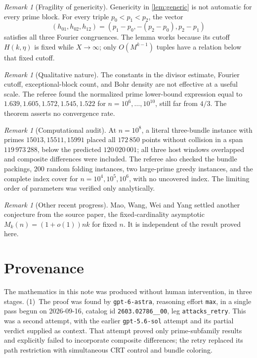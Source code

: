 \documentclass[11pt,a4paper]{article}
\theoremstyle{plain}
\theoremstyle{definition}
\theoremstyle{remark}
\newtheorem{remark}[theorem]{Remark}
\begin{document}
\begin{remark}[Fragility of genericity]
Genericity in \cref{lem:generic} is not automatic for every prime block. For every triple $p_0<p_1<p_2$, the vector
\[
 (h_{01},h_{02},h_{12})
 =(p_1-p_0,-(p_2-p_0),p_2-p_1)
\]
satisfies all three Fourier congruences. The lemma works because its cutoff $H(k,\eta)$ is fixed while $X\to\infty$; only $O(M^{k-1})$ tuples have a relation below that fixed cutoff.
\end{remark}

\begin{remark}[Qualitative nature]
The constants in the divisor estimate, Fourier cutoff, exceptional-block count, and Bohr density are not effective at a useful scale. The referee found the normalized prime lower-bound expression equal to $1.639,1.605,1.572,1.545,1.522$ for $n=10^6,\ldots,10^{10}$, still far from $4/3$. The theorem asserts no convergence rate.
\end{remark}

\begin{remark}[Computational audit]
At $n=10^8$, a literal three-bundle instance with primes $15013,\allowbreak 15511,\allowbreak 15991$ placed all $172\,850$ points without collision in a span $119\,973\,288$, below the predicted $120\,020\,001$; all three host windows overlapped and composite differences were included. The referee also checked the bundle packings, $200$ random folding instances, two large-prime greedy instances, and the complete index cover for $n=10^4,\allowbreak 10^5,\allowbreak 10^6$, with no uncovered index. The limiting order of parameters was verified only analytically.
\end{remark}

\begin{remark}[Other recent progress]
Mao, Wang, Wei and Yang \cite{MWWY26} settled another conjecture from the source paper, the fixed-cardinality asymptotic $M_k(n)=(1+o(1))nk$ for fixed $n$. It is independent of the result proved here.
\end{remark}

\section{Provenance}\label{sec:provenance}

The mathematics in this note was produced without human intervention, in three stages.
(1)~The proof was found by \texttt{gpt-6-astra}, reasoning effort \texttt{max}, in a single pass begun on 2026-09-16, catalog id \texttt{2603.02786\_\_00}, leg \texttt{attacks\_retry}. This was a second attempt, with the earlier \texttt{gpt-5.6-sol} attempt and its partial verdict supplied as context. That attempt proved only prime-subfamily results and explicitly failed to incorporate composite differences; the retry replaced its path restriction with simultaneous CRT control and bundle coloring.
\end{document}
